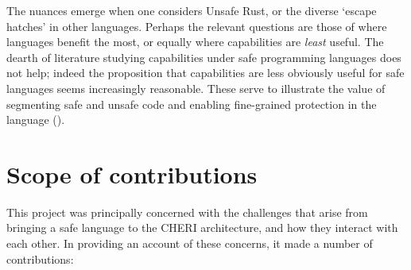 \documentclass[dissertation.tex]{subfiles}
\begin{document}
The nuances emerge when one considers Unsafe Rust, or the diverse
`escape hatches' in other languages.
Perhaps the relevant questions are those of where languages benefit the
most, or equally where capabilities are \emph{least} useful.
The dearth of literature studying capabilities under safe programming
languages does not help;
indeed the proposition that capabilities are less obviously useful for
safe languages seems increasingly reasonable.
These serve to illustrate the value of segmenting safe and unsafe code
and enabling fine-grained protection in the language
().


\section{Scope of contributions}

This project was principally concerned with the challenges that arise
from bringing a safe language to the CHERI architecture, and how they
interact with each other.
In providing an account of these concerns, it made a number of
contributions:
\end{document}
